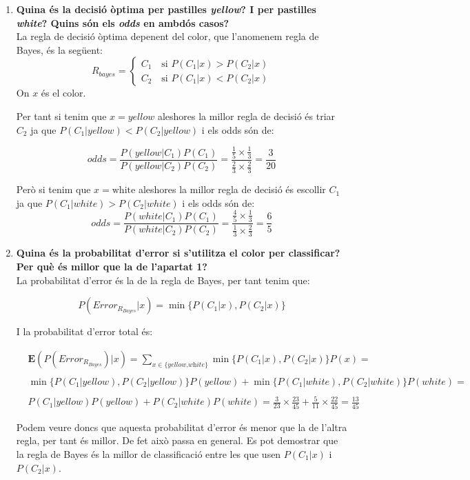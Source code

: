 \documentclass[a4paper]{article}
\begin{document}
\begin{enumerate}
	\item\textbf{ Quina és la decisió òptima per pastilles \textit{yellow}? I per pastilles \textit{white}? Quins són els \textit{odds} en ambdós casos?}\\
	
	 La regla de decisió òptima depenent del color, que l'anomenem regla de Bayes, és la següent:
	$$
	R_{bayes} =
	\begin{cases}
	C_1 \quad \text{si } P(C_1 | x) > P(C_2 | x) \\
	C_2 \quad \text{si } P(C_1 | x) < P(C_2 | x)
	\end{cases}
	$$	
	On $x$ és el color.
	
	Per tant si tenim que $x = \textit{yellow}$ aleshores la millor regla de decisió és triar $C_2$ ja que $P(C_1 | yellow) < P(C_2 | yellow)$ i els odds són de:
	
	$$
	\textit{odds} = \frac{P(yellow | C_1) P(C_1)}{P(yellow | C_2) P(C_2)} = \frac{\frac{1}{5} \times \frac{1}{3}}{\frac{2}{3} \times \frac{2}{3}} = \boxed{\frac{3}{20}}
	$$
	
	Però si tenim que $x = \text{white}$ aleshores la millor regla de decisió és escollir $C_1$ ja que $P(C_1 | white) > P(C_2 | white)$ i els odds són de:
	$$
	\textit{odds} = \frac{P(white | C_1) P(C_1)}{P(white | C_2) P(C_2)} = \frac{\frac{4}{5} \times \frac{1}{3}}{\frac{1}{3} \times \frac{2}{3}} = \boxed{\frac{6}{5}}
	$$
	
	\item\textbf{Quina és la probabilitat d'error si s'utilitza el color per classificar? Per què és millor que la de l'apartat 1?}\\
	
	La probabilitat d'error és la de la regla de Bayes, per tant tenim que:
	
	$$P(Error_{R_{Bayes}} | x) = \min\{P(C_1 | x),P(C_2 | x)\}$$
	
	I la probabilitat d'error total és:
	
	\begin{align*}
	&\mathbf{E}(P(Error_{R_{Bayes}}) | x) = \sum_{x \in {\{\textit{yellow,white}}\}} \min \{P(C_1 | x) , P(C_2 | x)\} P(x) =\\\\
	& \min \{ P(C_1 | yellow) , P(C_2 | yellow)\} P(yellow)  + \min\{ P(C_1 | white) , P(C_2 | white) \} P(white) = \\\\
	& P(C_1 | yellow) P(yellow) + P(C_2 | white) P(white) = \frac{3}{23} \times \frac{23}{45} + \frac{5}{11} \times \frac{22}{45} = \boxed{\frac{13}{45}}
	\end{align*}
	
	Podem veure doncs que aquesta probabilitat d'error és menor que la de l'altra regla, per tant és millor. De fet això passa en general. Es pot demostrar que la regla de Bayes és la millor de classificació entre les que usen $P(C_1 | x)$ i $P(C_2 | x)$.


\end{enumerate}
\end{document}
